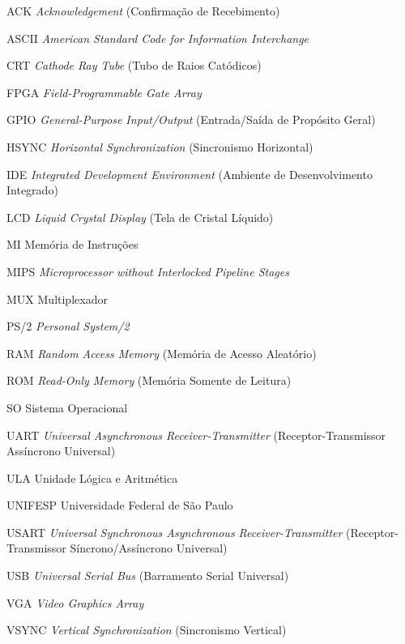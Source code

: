 \documentclass[
	12pt,
	oneside,
	a4paper,
	english,
	french,
	spanish,
	brazil,
	]{abntex2}
\begin{document}
\begin{siglas}
	\item[ACK] \emph{Acknowledgement} (Confirmação de Recebimento)
	\item[ASCII] \emph{American Standard Code for Information Interchange}
	\item[CRT] \emph{Cathode Ray Tube} (Tubo de Raios Catódicos)
	\item[FPGA] \emph{Field-Programmable Gate Array}
	\item[GPIO] \emph{General-Purpose Input/Output} (Entrada/Saída de Propósito Geral)
	\item[HSYNC] \emph{Horizontal Synchronization} (Sincronismo Horizontal)
	\item[IDE] \emph{Integrated Development Environment} (Ambiente de Desenvolvimento Integrado)
	\item[LCD] \emph{Liquid Crystal Display} (Tela de Cristal Líquido)
	\item[MI] Memória de Instruções
	\item[MIPS] \emph{Microprocessor without Interlocked Pipeline Stages}
	\item[MUX] Multiplexador
	\item[PS/2] \emph{Personal System/2}
	\item[RAM] \emph{Random Access Memory} (Memória de Acesso Aleatório)
	\item[ROM] \emph{Read-Only Memory} (Memória Somente de Leitura)
	\item[SO] Sistema Operacional
	\item[UART] \emph{Universal Asynchronous Receiver-Transmitter} (Receptor-Transmissor Assíncrono Universal)
	\item[ULA] Unidade Lógica e Aritmética
	\item[UNIFESP] Universidade Federal de São Paulo
	\item[USART] \emph{Universal Synchronous Asynchronous Receiver-Transmitter} (Receptor-Transmissor Síncrono/Assíncrono Universal)
	\item[USB] \emph{Universal Serial Bus} (Barramento Serial Universal)
	\item[VGA] \emph{Video Graphics Array}
	\item[VSYNC] \emph{Vertical Synchronization} (Sincronismo Vertical)
\end{siglas}
\clearpage

\tableofcontents*
\clearpage

\textual
\end{document}
